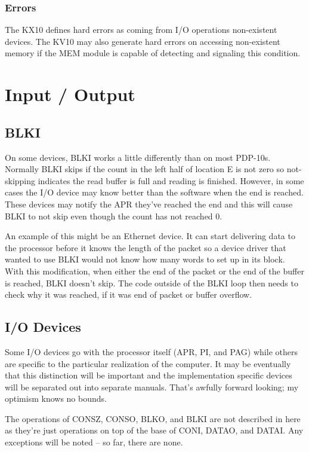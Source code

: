 \documentclass[12pt]{report}
\newcommand{\code}[1]{\textsf{#1}}
\begin{document}
\subsection{Errors}

The KX10 defines hard errors as coming from I/O operations non-existent devices.  The KV10
may also generate hard errors on accessing non-existent memory if the MEM module is
capable of detecting and signaling this condition.

\chapter{Input / Output}

\section{BLKI}

On some devices, \code{BLKI} works a little differently than on most PDP-10s.  Normally
\code{BLKI} skips if the count in the left half of location \code{E} is not zero so
not-skipping indicates the read buffer is full and reading is finished.  However, in some
cases the I/O device may know better than the software when the end is reached.  These
devices may notify the APR they've reached the end and this will cause \code{BLKI} to not
skip even though the count has not reached 0.

An example of this might be an Ethernet device.  It can start delivering data to the
processor before it knows the length of the packet so a device driver that wanted to use
\code{BLKI} would not know how many words to set up in its block.  With this modification,
when either the end of the packet or the end of the buffer is reached, \code{BLKI} doesn't
skip.  The code outside of the \code{BLKI} loop then needs to check why it was reached, if
it was end of packet or buffer overflow.

\section{I/O Devices}

Some I/O devices go with the processor itself (APR, PI, and PAG) while others are specific
to the particular realization of the computer.  It may be eventually that this distinction
will be important and the implementation specific devices will be separated out into
separate manuals.  That's awfully forward looking; my optimism knows no bounds.

The operations of \code{CONSZ}, \code{CONSO}, \code{BLKO}, and \code{BLKI} are not
described in here as they're just operations on top of the base of \code{CONI},
\code{DATAO}, and \code{DATAI}.  Any exceptions will be noted -- so far, there are none.
\end{document}
